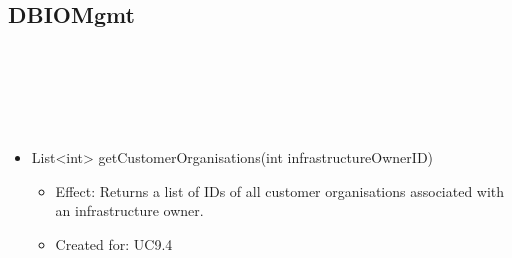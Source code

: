   \subsection{DBIOMgmt}\label{int:OtherDataDatabaseOtherDataDBDBIOMgmt}
    \begin{description}
      \item[Provided by:] \iconcomponent{}~
      \item[Required by:] \iconcomponent{}~
      \item[Operations:] ~
    \begin{itemize}[noitemsep,nolistsep,leftmargin=-.25cm]
      \item \textsf{List\textless{}int\textgreater{} getCustomerOrganisations(int infrastructureOwnerID)}
        \begin{itemize}[noitemsep,nolistsep]
           \item Effect: Returns a list of IDs of all customer organisations associated with an infrastructure owner.
\item Created for: UC9.4
        \end{itemize}
    \end{itemize}
    \end{description}


